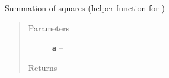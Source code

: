 \documentclass[letterpaper,10pt,english]{sphinxmanual}
\begin{document}
\begin{fulllineitems}
\label{RRtoolbox.lib.arrayops:RRtoolbox.lib.arrayops.basic.anorm2}
Summation of squares (helper function for {\hyperref[RRtoolbox.lib.arrayops:RRtoolbox.lib.arrayops.basic.anorm]{\emph{}}})
\begin{quote}\begin{description}
\item[{Parameters}] \leavevmode
\textbf{\texttt{a}} -- 

\item[{Returns}] \leavevmode


\end{description}\end{quote}

\end{fulllineitems}

\end{document}
